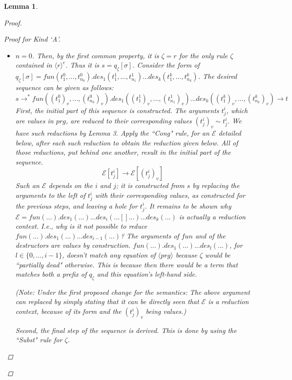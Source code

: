 \documentclass[11pt]{article} %
\newtheorem{lemma}{Lemma}
\begin{document}
\begin{lemma}
\begin{proof}
\begin{enumerate}
\begin{proof}[Proof for Kind `A']
\begin{itemize}
\item $n = 0$. Then, by the first common property, it is $\zeta = r$ for the only rule $\zeta$ contained in $\langle r \rangle^e$. Thus it is $s = q_\zeta[\sigma]$. Consider the form of $q_\zeta[\sigma] = fun(t^0_1, ..., t^0_{n_0}).des_1(t^1_1, ..., t^1_{n_1})...des_k(t^k_1, ..., t^k_{n_k})$. The desired sequence can be given as follows:
\begin{equation*}
s \longrightarrow^* fun((t^0_1)_v, ..., (t^0_{n_0})_v).des_1((t^1_1)_v, ..., (t^1_{n_1})_v)...des_k((t^k_1)_v, ..., (t^k_{n_k})_v) \longrightarrow t
\end{equation*}
First, the initial part of this sequence is constructed. The arguments $t^i_j$, which are values in $prg$, are reduced to their corresponding values $(t^i_j)_v \sim t^i_j$. We have such reductions by Lemma 3. Apply the ``Cong" rule, for an $\mathcal{E}$ detailed below, after each such reduction to obtain the reduction given below. All of those reductions, put behind one another, result in the initial part of the sequence.
\begin{equation*}
\mathcal{E}[t^i_j] \longrightarrow \mathcal{E}[(t^i_j)_v]
\end{equation*}
Such an $\mathcal{E}$ depends on the $i$ and $j$; it is constructed from $s$ by replacing the arguments to the left of $t^i_j$ with their corresponding values, as constructed for the previous steps, and leaving a hole for $t^i_j$. It remains to be shown why $\mathcal{E} = fun(...).des_1(...)...des_i(...[]...)...des_k(...)$ is actually a reduction context. I.e., why is it not possible to reduce $fun(...).des_1(...)...des_{i-1}(...)$? The arguments of $fun$ and of the destructors are values by construction. $fun(...).des_1(...)...des_l(...)$, for $l \in \{0, ..., i-1\}$, doesn't match any equation of $\langle prg \rangle$ because $\zeta$ would be ``partially dead" otherwise. This is because then there would be a term that matches both a prefix of $q_\zeta$ and this equation's left-hand side.

(Note: Under the first proposed change for the semantics: The above argument can replaced by simply stating that it can be directly seen that $\mathcal{E}$ is a reduction context, because of its form and the $(t^i_j)_v$ being values.) 

Second, the final step of the sequence is derived. This is done by using the ``Subst" rule for $\zeta$.


\end{itemize}
\end{proof}
\end{enumerate}
\end{proof}
\end{lemma}
\end{document}
